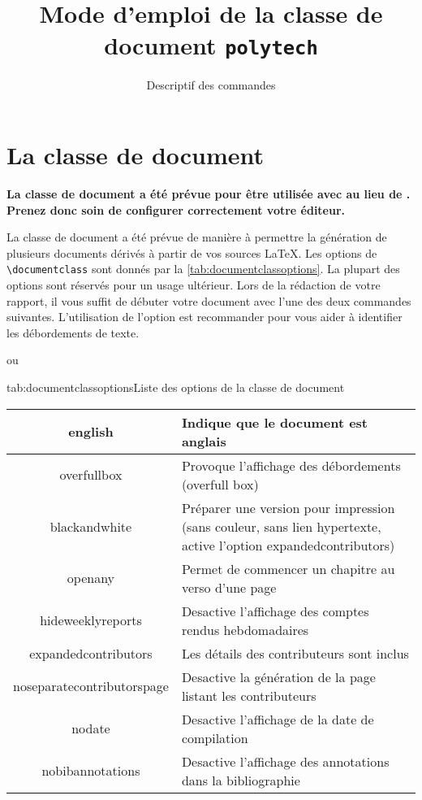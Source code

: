 \documentclass[overfullbox,hideweeklyreports,noseparatecontributorspage,nodate]{polytech}
\title{Mode d'emploi de la classe de document \texttt{polytech}}
\subtitle{Descriptif des commandes}
\begin{document}
\maketitle

\chapter{La classe de document}

\begin{center}
\textbf{La classe de document a été prévue pour être utilisée avec  au lieu de . Prenez donc soin de configurer correctement votre éditeur.}
\end{center}

La classe de document a été prévue de manière à permettre la génération de plusieurs documents dérivés à partir de vos sources LaTeX. Les options de \texttt{\textbackslash{}documentclass} sont donnés par la \autoref{tab:documentclassoptions}. La plupart des options sont réservés pour un usage ultérieur. Lors de la rédaction de votre rapport, il vous suffit de débuter votre document avec l'une des deux commandes suivantes. L'utilisation de l'option  est recommander pour vous aider à identifier les débordements de texte.
ou

\begin{Table}{tab:documentclassoptions}{Liste des options de la classe de document}
\begin{tabu}{|c|X[m]|}
\hline
english&Indique que le document est anglais\\\hline
overfullbox&Provoque l'affichage des débordements (overfull box)\\\hline
blackandwhite&Préparer une version pour impression (sans couleur, sans lien hypertexte, active l'option expandedcontributors)\\\hline
openany&Permet de commencer un chapitre au verso d'une page\\\hline
hideweeklyreports&Desactive l'affichage des comptes rendus hebdomadaires\\\hline
expandedcontributors&Les détails des contributeurs sont inclus\\\hline
noseparatecontributorspage&Desactive la génération de la page listant les contributeurs\\\hline
nodate&Desactive l'affichage de la date de compilation\\\hline
nobibannotations&Desactive l'affichage des annotations dans la bibliographie\\\hline
\end{tabu}
\end{Table}
\end{document}
